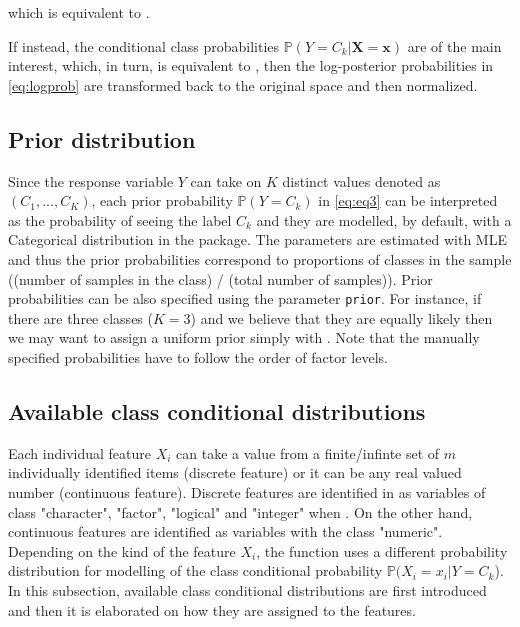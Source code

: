 \documentclass{article}\usepackage[]{graphicx}\usepackage[]{color}
\begin{document}
which is equivalent to  \textcolor{darkgreen}{{}}.

\vspace{3mm}

If instead, the conditional class probabilities $\mathbb{P}(Y = C_k | \boldsymbol{X} = \boldsymbol{x})$ are of the main interest, which, in turn, is equivalent to \textcolor{darkgreen}{{}}, then the log-posterior probabilities in \eqref{eq:logprob} are transformed back to the original space and then normalized.


\label{subsection:prior_distribution}
\subsection{Prior distribution}

Since the response variable $Y$ can take on $K$ distinct values denoted as $(C_1,...,C_K)$, each prior probability $\mathbb{P}(Y = C_k)$ in \eqref{eq:eq3} can be interpreted as the probability of seeing the label $C_k$ and they are modelled, by default, with a Categorical distribution in the \textcolor{darkgreen}{{}} package. The parameters are estimated with MLE and thus the prior probabilities correspond to proportions of classes in the sample ((number of samples in the class) / (total number of samples)). Prior probabilities can be also specified using the parameter \texttt{prior}. For instance, if there are three classes ($K=3$) and we believe that they are equally likely then we may want to assign a uniform prior simply with \textcolor{darkgreen}{{}}.  Note that the manually specified probabilities have to follow the order of factor levels.


\subsection{Available class conditional distributions}

Each individual feature $X_i$ can take a value from a finite/infinte set of $m$ individually identified items (discrete feature) or it can be any real valued number (continuous feature). Discrete features are identified in \textcolor{darkgreen}{{}} as variables of class "character", "factor", "logical" and "integer" when \textcolor{darkgreen}{{}}. On the other hand, continuous features are identified as variables with the class "numeric". Depending on the kind of the feature $X_i$, the \textcolor{darkgreen}{{}} function uses a different probability distribution for modelling of the class conditional probability $\mathbb{P}(X_i = x_i | Y = C_k$). In this subsection, available class conditional distributions are first introduced and then it is elaborated on how they are assigned to the features.
\end{document}
